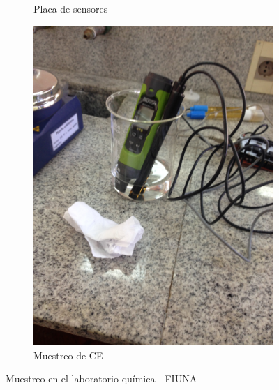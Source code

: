 \begin{figure}
\begin{subfigure}[b]{0.4\textwidth}
         \caption{Placa de sensores}
         \label{fig:placas_muestreo}
     \end{subfigure}
     \hfill
     \begin{subfigure}[b]{0.25\textwidth}
         \centering
         \includegraphics[angle=270,width=\textwidth]{Imagenes/cap4/qca3.jpg}
         \caption{Muestreo de CE}
         \label{fig: Muestreo de CE}
     \end{subfigure}
        \caption{Muestreo en el laboratorio qu\'imica - FIUNA}
        \label{fig:muestreoQCA}
\end{figure}
